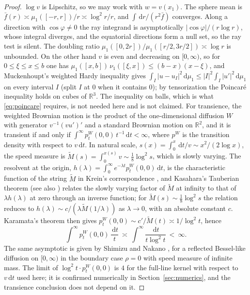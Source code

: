 \documentclass[11pt]{amsart}
\newcommand{\R}{\mathbb{R}}
\newcommand{\dd}{\,\mathrm{d}}
\newcommand{\abs}[1]{\lvert #1\rvert}
\newcommand{\fbar}{\bar f}
\theoremstyle{plain}
\theoremstyle{definition}
\theoremstyle{remark}
\begin{document}
\begin{proof}
$\log v$ is Lipschitz, so we may work with $w=v(x_1)$. The sphere mean is
$\fbar(r)\asymp\mu_1([-r,r])/r\asymp\log^2r/r$, and $\int\dd r/(r^2\fbar)$
converges. Along a direction with $\cos\varphi\ne0$ the ray integrand is
asymptotically $\abs{\cos\varphi}/(r\log r)$, whose integral diverges, and the
equatorial directions form a null set, so the ray test is silent. The doubling ratio
$\mu_1([0,2r])/\mu_1([r/2,3r/2])\asymp\log r$ is unbounded. On the other hand $v$
is even and decreasing on $[0,\infty)$, so for $0\le\xi\le x\le b$ one has
$\mu_1([x,b])\,\nu_1([\xi,x])\le(b-x)(x-\xi)$, and Muckenhoupt's weighted Hardy
inequality gives $\int_I\abs{u-u_I}^2\dd\mu_1\le\abs I^2\int_I\abs{u'}^2\dd\mu_1$
on every interval $I$ (split $I$ at $0$ when it contains $0$); by tensorization
the Poincar\'e inequality holds on cubes of $\R^3$. The inequality on balls, which
is what \eqref{eq:poincare} requires, is not needed here and is not claimed. For
transience, the
weighted Brownian motion is the product of the one-dimensional diffusion $W$
with generator $v^{-1}(vu')'$ and a standard Brownian motion on $\R^2$, and it
is transient if and only if $\int^\infty p^W_t(0,0)\,t^{-1}\dd t<\infty$,
where $p^W$ is the transition density with respect to $v\dd t$. In natural
scale, $s(x)=\int_0^x\dd t/v\sim x^2/(2\log x)$, the speed measure is
$\widetilde M(s)=\int_0^{x(s)}v\sim\frac18\log^2s$, which is slowly varying.
The resolvent at the origin, $h(\lambda)=\int_0^\infty e^{-\lambda t}p^W_t(0,0)\dd t$,
is the characteristic function of the string $\widetilde M$ in Krein's
correspondence \cite[eqs.~(5), (10)]{kasahara1975}, and Kasahara's Tauberian
theorem \cite[Thm.~2(iii), case $\alpha=1$]{kasahara1975} (see also
\cite{kotaniwatanabe1982,kasaharawatanabe2010}) relates the slowly varying
factor of $\widetilde M$ at infinity to that of $\lambda h(\lambda)$ at zero
through an inverse function; for $\widetilde M(s)\sim\frac18\log^2s$ the
relation reduces to $h(\lambda)\sim c/(\lambda\widetilde M(1/\lambda))$ as
$\lambda\to0$, with an absolute constant $c$. Karamata's theorem then gives
$p^W_t(0,0)\sim c'/\widetilde M(t)\asymp1/\log^2t$, hence
\[
\int^\infty p^W_t(0,0)\,\frac{\dd t}{t}\ \asymp\ \int^\infty\frac{\dd t}{t\log^2t}\ <\ \infty .
\]
The same asymptotic is given by Shimizu and Nakano
\cite[Thm.~1.3]{shimizunakano2017}, for a reflected Bessel-like diffusion on
$[0,\infty)$ in the boundary case $\rho=0$ with speed measure of infinite mass.
The limit of $\log^2t\cdot p^W_t(0,0)$ is $4$ for the full-line kernel with respect to
$v\dd t$ used here; it is confirmed numerically in Section~\ref{sec:numerics},
and the transience conclusion does not depend on it.
\end{proof}
\end{document}
